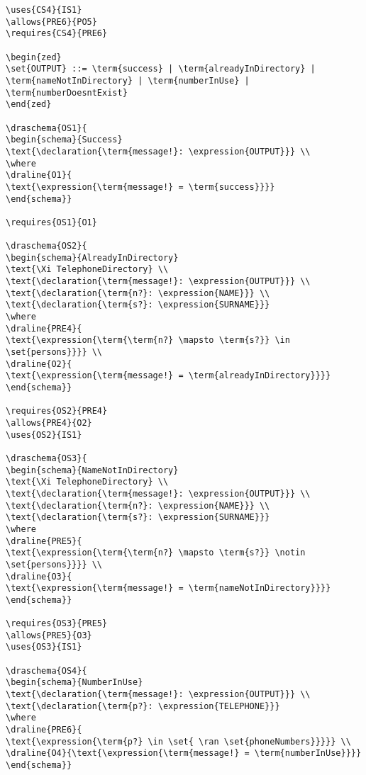 \begin{verbatim}
\uses{CS4}{IS1}
\allows{PRE6}{PO5}
\requires{CS4}{PRE6}

\begin{zed}
\set{OUTPUT} ::= \term{success} | \term{alreadyInDirectory} | \term{nameNotInDirectory} | \term{numberInUse} | \term{numberDoesntExist}
\end{zed}

\draschema{OS1}{
\begin{schema}{Success}
\text{\declaration{\term{message!}: \expression{OUTPUT}}} \\
\where
\draline{O1}{
\text{\expression{\term{message!} = \term{success}}}}
\end{schema}}

\requires{OS1}{O1}

\draschema{OS2}{
\begin{schema}{AlreadyInDirectory}
\text{\Xi TelephoneDirectory} \\
\text{\declaration{\term{message!}: \expression{OUTPUT}}} \\
\text{\declaration{\term{n?}: \expression{NAME}}} \\
\text{\declaration{\term{s?}: \expression{SURNAME}}}
\where
\draline{PRE4}{
\text{\expression{\term{\term{n?} \mapsto \term{s?}} \in \set{persons}}}} \\
\draline{O2}{
\text{\expression{\term{message!} = \term{alreadyInDirectory}}}}
\end{schema}}

\requires{OS2}{PRE4}
\allows{PRE4}{O2}
\uses{OS2}{IS1}

\draschema{OS3}{
\begin{schema}{NameNotInDirectory}
\text{\Xi TelephoneDirectory} \\
\text{\declaration{\term{message!}: \expression{OUTPUT}}} \\
\text{\declaration{\term{n?}: \expression{NAME}}} \\
\text{\declaration{\term{s?}: \expression{SURNAME}}}
\where
\draline{PRE5}{
\text{\expression{\term{\term{n?} \mapsto \term{s?}} \notin \set{persons}}}} \\
\draline{O3}{
\text{\expression{\term{message!} = \term{nameNotInDirectory}}}}
\end{schema}}

\requires{OS3}{PRE5}
\allows{PRE5}{O3}
\uses{OS3}{IS1}

\draschema{OS4}{
\begin{schema}{NumberInUse}
\text{\declaration{\term{message!}: \expression{OUTPUT}}} \\
\text{\declaration{\term{p?}: \expression{TELEPHONE}}}
\where
\draline{PRE6}{
\text{\expression{\term{p?} \in \set{ \ran \set{phoneNumbers}}}}} \\
\draline{O4}{\text{\expression{\term{message!} = \term{numberInUse}}}}
\end{schema}}


\end{verbatim}
